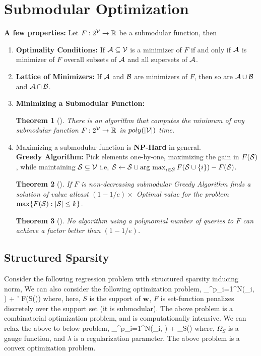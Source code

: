 \documentclass[11pt]{article}
\newtheorem{theorem}{Theorem}{\bf}{\it}
\begin{document}
\section{Submodular Optimization}
\textbf{A few properties:} Let $F: 2^{\V} \to \R$ be a submodular function, then
\begin{enumerate}
\item \textbf{Optimality Conditions:} If $\A \subseteq \V$ is a minimizer of $F$ if and only if $\A$ is minimizer of $F$ overall
subsets of $\A$ and all supersets of $\A$.
\item \textbf{Lattice of Minimizers:} If $\A$ and $\B$ are minimizers of $F$, then so are $\A \cup \B$ and $\A \cap \B$.
\item \textbf{Minimizing a Submodular Function:} 
\begin{theorem}[\cite{grotschel_ellipsoid_1981}]
  There is an algorithm that computes the minimum of any submodular
  function $F: 2^{\V} \to \R$ in $poly(|\V|)$ time.
\end{theorem}
\item Maximizing a submodular function is \textbf{NP-Hard} in general.\\
\textbf{Greedy Algorithm:} Pick elements one-by-one, maximizing the gain
in $F(\S)$, while maintaining $\S \subseteq \V$ i.e, $\S \gets \S \cup \argmax_{i \in \S}F(\S \cup \{i\}) - F(\S)$.
\begin{theorem}[\cite{nemhauser_analysis_1978}]
If $F$ is non-decreasing submodular Greedy Algorithm finds a solution
of value atleast $(1-1/e) \times$ Optimal value for the problem $\max\{F(\S): |\S| \leq k\}$.
\end{theorem}
\begin{theorem}[\cite{Nemhauser-Wolsey-78}]
No algorithm using a polynomial number of
queries to $F$ can achieve a factor better than $(1-1/e)$.
\end{theorem}

\end{enumerate}

\subsection{Structured Sparsity}
Consider the following regression problem with structured sparsity inducing norm,
We can also consider the following optimization problem,
\bd
\min_{\w \in \R^{p}}\sum_{i=1}^{N}(\y_i, ) + \lambda' F(S(\w))
\ed
where, here, $S$ is the support of $\w$, $F$ is set-function penalizes discretely over the support set 
(it is submodular). The above problem
is a combinatorial optimization problem, and is computationally intensive. We can relax the above to below problem,
\bd
\min_{\w \in \R^p}\sum_{i=1}^{N}(\y_i, ) + \lambda \Omega_{S}(\w)
\ed
where, $\Omega_{S}$ is a gauge function, and $\lambda$ is a regularization parameter. The above problem is a convex optimization problem.
\end{document}
